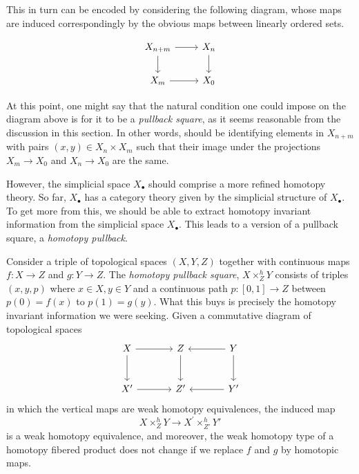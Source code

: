 \documentclass[a4paper,11pt]{article}
\theoremstyle{plain}
\theoremstyle{definition}
\theoremstyle{remark}
\begin{document}
This in turn can be encoded by considering the following diagram, whose maps are induced correspondingly by the obvious maps between linearly ordered sets. 

\begin{equation}
\label{segal_condition}
    \begin{tikzcd}
    X_{n+m} \arrow[r] \arrow[d] & X_n\arrow[d]\\
    X_m \arrow[r] & X_0
    \end{tikzcd}
\end{equation}

At this point, one might say that the  natural condition one could impose on the diagram above is for it to be a \textit{pullback square}, as it seems reasonable from the discussion in this section. In other words, should be identifying elements in $X_{n+m}$ with pairs $(x, y) \in X_n \times X_m$ such that their image under the projections $X_m \to X_0$ and $X_n \to X_0$ are the same. 

However, the simplicial space $X_{\bullet}$ should comprise a more refined homotopy theory. So far, $X_{\bullet}$ has a category theory given by the simplicial structure of $X_{\bullet}$. To get more from this, we should be able to extract homotopy invariant information from the simplicial space $X_{\bullet}$. This leads to a  version of a pullback square, a \textit{homotopy pullback}. 

Consider a triple of topological spaces $(X, Y, Z)$ together with continuous maps $f \colon X \to Z$ and $g \colon Y \to Z$. The \textit{homotopy pullback square}, $X \times_{Z}^h Y$ consists of triples $(x, y, p)$ where $x \in X, y \in Y$ and a continuous path $p \colon [0, 1] \to Z$ between $p(0) = f(x)$ to $p(1) = g(y)$. What this buys is precisely the homotopy invariant information we were seeking. Given a commutative diagram of topological spaces 
\begin{equation*}
    \begin{tikzcd}[row sep = large, column sep = large]
    X \arrow[r] \arrow[d] & Z \arrow[d] & Y \arrow[l] \arrow[d]\\
    X' \arrow[r] & Z' & Y' \arrow[l]
    \end{tikzcd}
\end{equation*}
in which the vertical maps are weak homotopy equivalences, the induced map 
$$X \times_Z^h Y \to X^{'} \times_{Z'}^h  Y'$$
is a weak homotopy equivalence, and moreover, the weak homotopy type of a homotopy fibered product does not change if we replace $f$ and $g$ by homotopic maps.  
\end{document}
